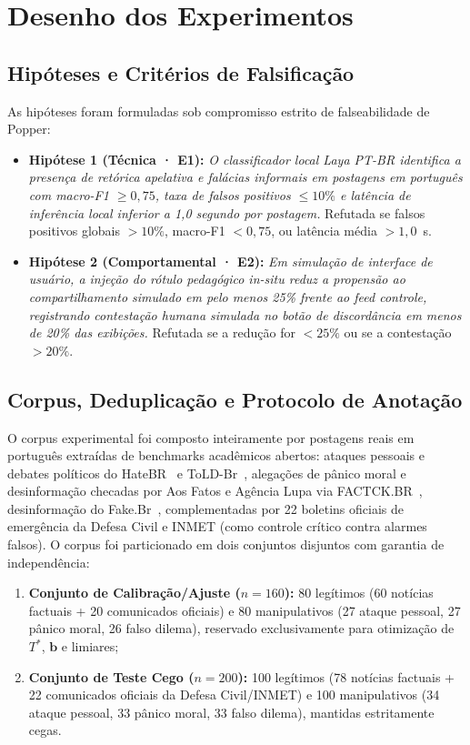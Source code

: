 \documentclass[runningheads]{llncs}
\begin{document}
\section{Desenho dos Experimentos}

\subsection{Hipóteses e Critérios de Falsificação}

As hipóteses foram formuladas sob compromisso estrito de falseabilidade de Popper:
\begin{itemize}
    \item \textbf{Hipótese 1 (Técnica · E1):} \textit{O classificador local Laya PT-BR identifica a presença de retórica apelativa e falácias informais em postagens em português com macro-F1 $\ge 0{,}75$, taxa de falsos positivos $\le 10\%$ e latência de inferência local inferior a 1,0 segundo por postagem.} Refutada se falsos positivos globais $>10\%$, macro-F1 $<0{,}75$, ou latência média $>1{,}0$~s.
    \item \textbf{Hipótese 2 (Comportamental · E2):} \textit{Em simulação de interface de usuário, a injeção do rótulo pedagógico in-situ reduz a propensão ao compartilhamento simulado em pelo menos 25\% frente ao feed controle, registrando contestação humana simulada no botão de discordância em menos de 20\% das exibições.} Refutada se a redução for $<25\%$ ou se a contestação $>20\%$.
\end{itemize}

\subsection{Corpus, Deduplicação e Protocolo de Anotação}

O corpus experimental foi composto inteiramente por postagens reais em português extraídas de benchmarks acadêmicos abertos: ataques pessoais e debates políticos do HateBR~\cite{vargas2022hatebr} e ToLD-Br~\cite{leite2020toxic}, alegações de pânico moral e desinformação checadas por Aos Fatos e Agência Lupa via FACTCK.BR~\cite{filho2019factck}, desinformação do Fake.Br~\cite{monteiro2018contributions}, complementadas por 22 boletins oficiais de emergência da Defesa Civil e INMET (como controle crítico contra alarmes falsos). O corpus foi particionado em dois conjuntos disjuntos com garantia de independência:
\begin{enumerate}
    \item \textbf{Conjunto de Calibração/Ajuste ($n=160$):} 80 legítimos (60 notícias factuais + 20 comunicados oficiais) e 80 manipulativos (27 ataque pessoal, 27 pânico moral, 26 falso dilema), reservado exclusivamente para otimização de $T^*$, $\mathbf{b}$ e limiares;
    \item \textbf{Conjunto de Teste Cego ($n=200$):} 100 legítimos (78 notícias factuais + 22 comunicados oficiais da Defesa Civil/INMET) e 100 manipulativos (34 ataque pessoal, 33 pânico moral, 33 falso dilema), mantidas estritamente cegas.
\end{enumerate}
\end{document}

